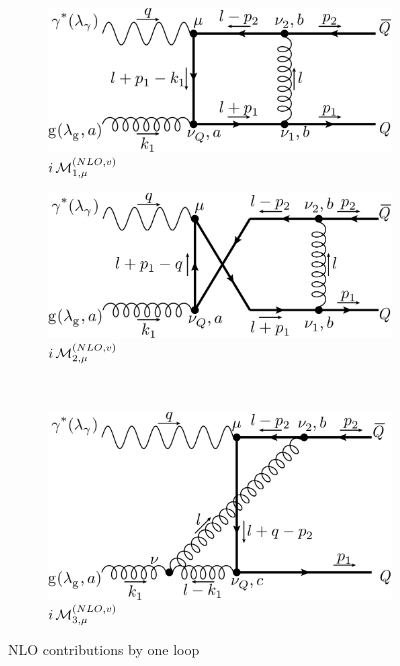 \begin{figure}[ht!]
	\centering
	\begin{subfigure}[t]{.4\textwidth}
		\includegraphics[width=\textwidth]{pyfeyn/nlo-v-box1}
		\caption{$i\operatorname{\mathcal M}^{(NLO,v)}_{1,\mu}$}
	\end{subfigure}\hspace{.15\textwidth}%
	\begin{subfigure}[t]{.4\textwidth}
		\includegraphics[width=\textwidth]{pyfeyn/nlo-v-box1cr}
		\caption{$i\operatorname{\mathcal M}^{(NLO,v)}_{2,\mu}$}
	\end{subfigure}\\
	\begin{subfigure}[t]{.6\textwidth}
		\includegraphics[width=\textwidth]{pyfeyn/nlo-v-box2}
		\caption{$i\operatorname{\mathcal M}^{(NLO,v)}_{3,\mu}$}
	\end{subfigure}
	\caption{NLO contributions by one loop}\label{fig:FeynNLOvab}
\end{figure}

